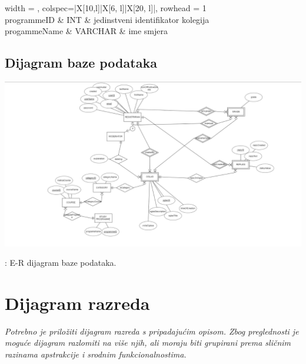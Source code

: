 				\begin{longtblr}[
					label=none,
					entry=none
					]{
						width = \textwidth,
						colspec={|X[10,l]|X[6, l]|X[20, l]|}, 
						rowhead = 1
					} 
					\hline 
						 \\ \hline[3pt]
					programmeID & INT	&  jedinstveni identifikator kolegija
					\\ \hline
					progammeName & VARCHAR & ime smjera 	\\ \hline
				\end{longtblr}
			
			\eject
			\subsection{Dijagram baze podataka}
			\begin{fig}
			    \graphicspath{ {slike/} }
  
                \centering
                \includegraphics[width=\textwidth]{ER-dijagram Baze Podataka}
                \caption{: E-R dijagram baze podataka.}
			    
			\end{fig}

 
			
			\eject
			
			
		\section{Dijagram razreda}
		
			\textit{Potrebno je priložiti dijagram razreda s pripadajućim opisom. Zbog preglednosti je moguće dijagram razlomiti na više njih, ali moraju biti grupirani prema sličnim razinama apstrakcije i srodnim funkcionalnostima.}\\
			

